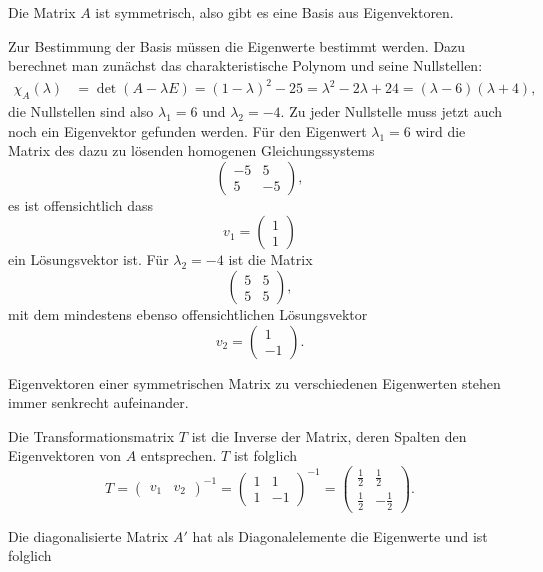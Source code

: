 \begin{loesung}
\begin{teilaufgaben}
\item
Die Matrix $A$ ist symmetrisch, also gibt es eine Basis aus
Eigenvektoren.
\item
Zur Bestimmung der Basis müssen die Eigenwerte bestimmt werden.
Dazu berechnet man zunächst das charakteristische Polynom und
seine Nullstellen:
\begin{align*}
\chi_A(\lambda)
&=\det(A-\lambda E)=(1-\lambda)^2-25=\lambda^2-2\lambda +24
=(\lambda-6)(\lambda +4),
\end{align*}
die Nullstellen sind also $\lambda_1=6$ und $\lambda_2=-4$. Zu jeder
Nullstelle muss jetzt auch noch ein Eigenvektor gefunden werden.
Für den Eigenwert $\lambda_1=6$ wird die Matrix des dazu zu lösenden
homogenen Gleichungssystems
\[
\begin{pmatrix}-5&5\\5&-5\end{pmatrix},
\]
es ist offensichtlich dass
\[
v_1=\begin{pmatrix}1\\1\end{pmatrix}
\]
ein Lösungsvektor ist. Für $\lambda_2=-4$ ist die Matrix
\[
\begin{pmatrix}5&5\\5&5\end{pmatrix},
\]
mit dem mindestens ebenso offensichtlichen Lösungsvektor
\[
v_2=\begin{pmatrix}1\\-1\end{pmatrix}.
\]
\item
Eigenvektoren einer symmetrischen Matrix zu verschiedenen Eigenwerten
stehen immer senkrecht aufeinander.
\item Die Transformationsmatrix $T$ ist die Inverse der Matrix, deren Spalten den Eigenvektoren von $A$ entsprechen. $T$ ist folglich
\[
    T = \begin{pmatrix}v_1 & v_2 \end{pmatrix}^{-1} = \begin{pmatrix}1 & 1\\ 1 & -1 \end{pmatrix}^{-1} = \begin{pmatrix}\frac{1}{2} & \frac{1}{2}\\ \frac{1}{2} & -\frac{1}{2} \end{pmatrix}.
\]
\item Die diagonalisierte Matrix $A'$ hat als Diagonalelemente die Eigenwerte und ist folglich

\end{teilaufgaben}
\end{loesung}
